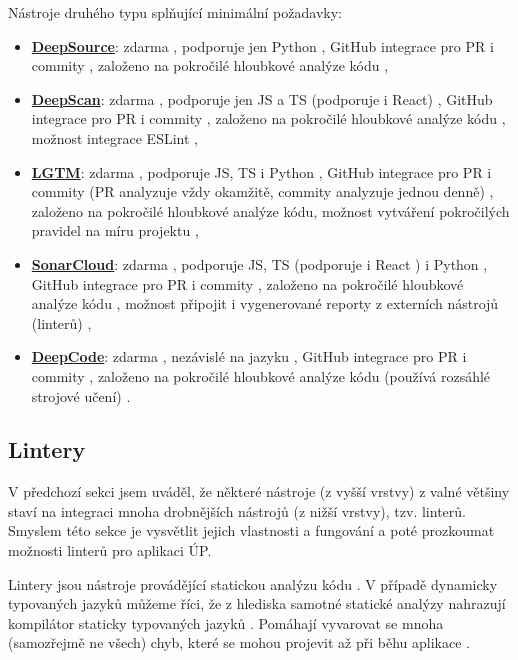 Nástroje druhého typu splňující minimální požadavky:
\begin{itemize}
    \item \href{https://deepsource.io/}{\textbf{DeepSource}}: zdarma \cite{deepsource}, podporuje jen Python \cite{deepsource}, GitHub integrace pro PR i commity \cite{deepsource-docs}, založeno na pokročilé hloubkové analýze kódu \cite{deepsource2},
    \item \href{https://deepscan.io}{\textbf{DeepScan}}: zdarma \cite{deepscan-pricing}, podporuje jen JS a TS (podporuje i React) \cite{deepscan}, GitHub integrace pro PR i commity \cite{deepscan}, založeno na pokročilé hloubkové analýze kódu \cite{deepscan}, možnost integrace ESLint \cite{deepscan-eslint},
    \item \href{https://lgtm.com}{\textbf{LGTM}}: zdarma \cite{lgtm}, podporuje JS, TS i Python \cite{lgtm-faq}, GitHub integrace pro PR i commity (PR analyzuje vždy okamžitě, commity analyzuje jednou denně) \cite{lgtm-faq}, založeno na pokročilé hloubkové analýze kódu, možnost vytváření pokročilých pravidel na míru projektu \cite{lgtm},
    \item \href{https://sonarcloud.io/}{\textbf{SonarCloud}}: zdarma \cite{sonarcloud}, podporuje JS, TS (podporuje i React \cite{sonarcloud-js}) i Python \cite{sonarcloud}, GitHub integrace pro PR i commity \cite{sonarcloud-gh}, založeno na pokročilé hloubkové analýze kódu \cite{sonarcloud2}, možnost připojit i vygenerované reporty z externích nástrojů (linterů) \cite{sonarcloud-engines},
    \item \href{https://www.deepcode.ai/}{\textbf{DeepCode}}: zdarma \cite{deepcode}, nezávislé na jazyku \cite{deepsource2}, GitHub integrace pro PR i commity \cite{deepcode}, založeno na pokročilé hloubkové analýze kódu (používá rozsáhlé strojové učení) \cite{deepcode2}.
\end{itemize}

\subsection{Lintery}\label{subsec:lintery}

V předchozí sekci jsem uváděl, že některé nástroje (z vyšší vrstvy) z valné většiny staví na integraci mnoha drobnějších nástrojů (z nižší vrstvy), tzv. linterů. Smyslem této sekce je vysvětlit jejich vlastnosti a fungování a poté prozkoumat možnosti linterů pro aplikaci ÚP. 

Lintery jsou nástroje provádějící statickou analýzu kódu \cite{linter-medium1}. V případě dynamicky typovaných jazyků můžeme říci, že z hlediska samotné statické analýzy nahrazují kompilátor staticky typovaných jazyků \cite{linter-medium1}. Pomáhají vyvarovat se mnoha (samozřejmě ne všech) chyb, které se mohou projevit až při běhu aplikace \cite{linter-medium1}.

